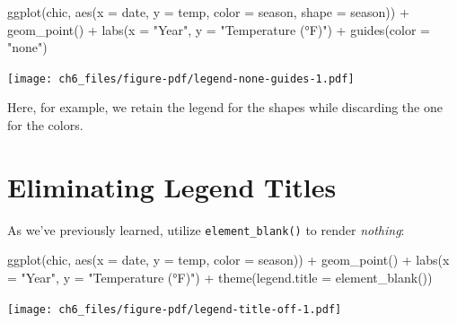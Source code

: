 \documentclass[
  letterpaper,
]{scrbook}
\newenvironment{Shaded}{\begin{snugshade}}{\end{snugshade}}
\newcommand{\AttributeTok}[1]{\textcolor[rgb]{0.40,0.45,0.13}{#1}}
\newcommand{\FunctionTok}[1]{\textcolor[rgb]{0.28,0.35,0.67}{#1}}
\newcommand{\NormalTok}[1]{\textcolor[rgb]{0.00,0.23,0.31}{#1}}
\newcommand{\SpecialCharTok}[1]{\textcolor[rgb]{0.37,0.37,0.37}{#1}}
\newcommand{\StringTok}[1]{\textcolor[rgb]{0.13,0.47,0.30}{#1}}
\begin{document}
\begin{Shaded}
\begin{Highlighting}[]
\FunctionTok{ggplot}\NormalTok{(chic,}
       \FunctionTok{aes}\NormalTok{(}\AttributeTok{x =}\NormalTok{ date, }\AttributeTok{y =}\NormalTok{ temp,}
           \AttributeTok{color =}\NormalTok{ season, }\AttributeTok{shape =}\NormalTok{ season)) }\SpecialCharTok{+}
  \FunctionTok{geom\_point}\NormalTok{() }\SpecialCharTok{+}
  \FunctionTok{labs}\NormalTok{(}\AttributeTok{x =} \StringTok{"Year"}\NormalTok{, }\AttributeTok{y =} \StringTok{"Temperature (°F)"}\NormalTok{) }\SpecialCharTok{+}
  \FunctionTok{guides}\NormalTok{(}\AttributeTok{color =} \StringTok{"none"}\NormalTok{)}
\end{Highlighting}
\end{Shaded}

\texttt{[image: ch6\_files/figure-pdf/legend-none-guides-1.pdf]}

Here, for example, we retain the legend for the shapes while discarding
the one for the colors.

\section{Eliminating Legend Titles}\label{eliminating-legend-titles}

As we've previously learned, utilize \texttt{element\_blank()} to render
\emph{nothing}:

\begin{Shaded}
\begin{Highlighting}[]
\FunctionTok{ggplot}\NormalTok{(chic, }\FunctionTok{aes}\NormalTok{(}\AttributeTok{x =}\NormalTok{ date, }\AttributeTok{y =}\NormalTok{ temp, }\AttributeTok{color =}\NormalTok{ season)) }\SpecialCharTok{+}
  \FunctionTok{geom\_point}\NormalTok{() }\SpecialCharTok{+}
  \FunctionTok{labs}\NormalTok{(}\AttributeTok{x =} \StringTok{"Year"}\NormalTok{, }\AttributeTok{y =} \StringTok{"Temperature (°F)"}\NormalTok{) }\SpecialCharTok{+}
  \FunctionTok{theme}\NormalTok{(}\AttributeTok{legend.title =} \FunctionTok{element\_blank}\NormalTok{())}
\end{Highlighting}
\end{Shaded}

\texttt{[image: ch6\_files/figure-pdf/legend-title-off-1.pdf]}
\end{document}
